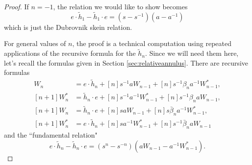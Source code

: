 \begin{proof}
If $n=-1$, the relation we would like to show becomes 
\begin{equation*}
e \cdot \tilde{h}_1 - \tilde{h}_1 \cdot e = (s-s^{-1}) \left( a - a^{-1} \right)
\end{equation*}
which is just the Dubrovnik skein relation. 

For general values of $n$, the proof is a technical computation using repeated applications of the recursive formula for the $\tilde{h}_n$. Since we will need them here, let's recall the formulas given in Section \ref{sec:relativeannulus}. There are recursive formulas
\begin{align}
[n+1] W_n &= e \cdot \tilde{h}_n + [n] s^{-1} a W_{n-1} + [n] s^{-1} \beta_n a^{-1} W^*_{n-1}, \label{eq:r1} \\
[n+1] W^*_n &= \tilde{h}_n \cdot e + [n] s^{-1} a^{-1} W^*_{n-1} + [n] s^{-1} \beta_n a W_{n-1}, \label{eq:r2} \\
[n+1] W_n &= \tilde{h}_n \cdot e + [n] s a W_{n-1} + [n] s \bar{\beta}_n a^{-1} W^*_{n-1}, \label{eq:r3} \\
[n+1] W^*_n &= e \cdot \tilde{h}_n + [n] s a^{-1} W^*_{n-1} + [n] s^{-1} \bar{\beta}_n a W_{n-1} \label{eq:r4}
\end{align}
and the ``fundamental relation"
\begin{equation}
e \cdot \tilde{h}_n - \tilde{h}_n \cdot e = (s^n - s^{-n}) (a W_{n-1} - a^{-1} W^*_{n-1}). \label{eq:f}
\end{equation}


\end{proof}
